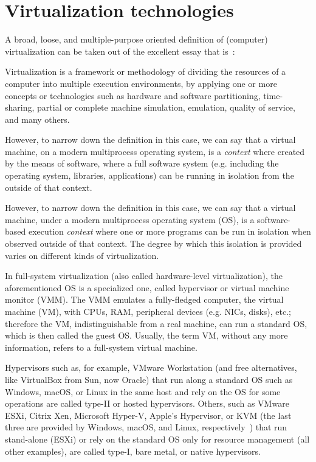 \section{Virtualization technologies}
\label{sec:leavingvirtualization}

A broad, loose, and multiple-purpose oriented definition of (computer) virtualization can be taken out of the excellent essay that is~\cite{introvirtualization}:
\begin{displayquote}
Virtualization is a framework or methodology of dividing the resources of a computer into multiple execution environments, by applying one or more concepts or technologies such as hardware and software partitioning, time-sharing, partial or complete machine simulation, emulation, quality of service, and many others.
\end{displayquote}

However, to narrow down the definition in this case, we can say that a virtual machine, on a modern multiprocess operating system, is a \emph{context} where created by the means of software, where a full software system (e.g. including the operating system, libraries, applications\textellipsis) can be running in isolation from the outside of that context.

However, to narrow down the definition in this case, we can say that a virtual machine, under  a modern multiprocess operating system (OS), is a software-based execution \emph{context} where one or more programs can be run in isolation when observed outside of that context.
The degree by which this isolation is provided varies on different kinds of virtualization.

In full-system virtualization (also called hardware-level virtualization), the aforementioned OS is a specialized one, called hypervisor or virtual machine monitor (VMM).
The VMM emulates a fully-fledged computer, the virtual machine (VM), with CPUs, RAM, peripheral devices (e.g. NICs, disks), etc.; therefore the VM, indistinguishable from a real machine, can run a standard OS, which is then called the guest OS.
Usually, the term VM, without any more information, refers to a full-system virtual machine.

Hypervisors such as, for example, VMware Workstation (and free alternatives, like VirtualBox from Sun, now Oracle) that run along a standard OS such as Windows, macOS, or Linux in the same host and rely on the OS for some operations are called type-II or hosted hypervisors.
Others, such as VMware ESXi, Citrix Xen, Microsoft Hyper-V, Apple's Hypervisor, or KVM (the last three are provided by Windows, macOS, and Linux, respectively~\cite{whatiskvm,applehypervisor,hyperv}) that run stand-alone (ESXi) or rely on the standard OS only for resource management (all other examples), are called type-I, bare metal, or native hypervisors.

